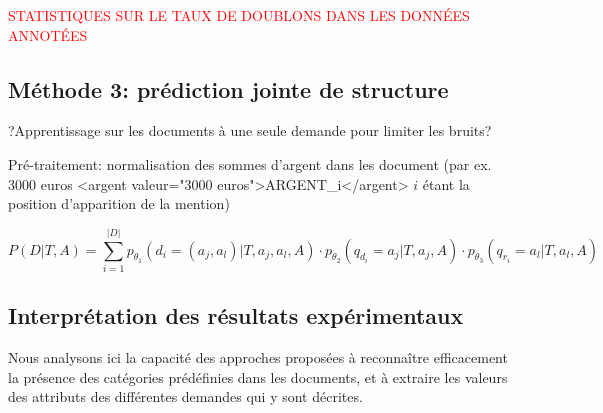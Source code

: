 \textcolor{red}{STATISTIQUES SUR LE TAUX DE DOUBLONS DANS LES DONNÉES ANNOTÉES}


\subsection{Méthode 3: prédiction jointe de structure}
?Apprentissage sur les documents à une seule demande pour limiter les bruits?

Pré-traitement: normalisation des sommes d'argent dans les document (par ex. 3000 euros <argent valeur="3000 euros">ARGENT\_i</argent> $i$ étant la position d'apparition de la mention)

\begin{equation}
P(D|T,A) = \sum\limits_{i=1}^{\vert D \vert} p_{\theta_1}(d_i = (a_j, a_l) | T, a_j, a_l, A) \cdot p_{\theta_2}(q_{d_i} = a_j | T, a_j, A) \cdot p_{\theta_3}(q_{r_i} = a_l | T, a_l, A)    
\end{equation}

\subsection{Interprétation des résultats expérimentaux}
Nous analysons ici la capacité des approches proposées à reconnaître efficacement la présence des catégories prédéfinies dans les documents, et à extraire les valeurs des attributs des différentes demandes qui y sont décrites. 



